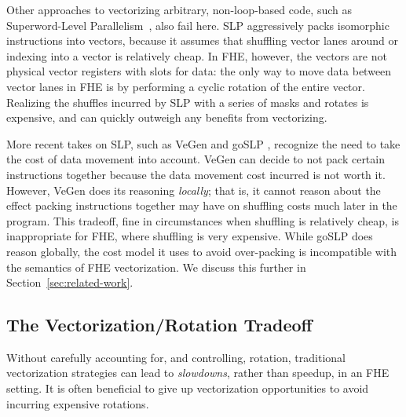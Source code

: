 Other approaches to vectorizing arbitrary, non-loop-based code, such as Superword-Level Parallelism~\cite{SLP}, also fail here.
SLP aggressively packs isomorphic instructions into vectors, because it assumes that shuffling vector lanes around or indexing into a vector is relatively cheap.
In FHE, however, the vectors are not physical vector registers with slots for data: %
the only way to move data between vector lanes in FHE is by performing a cyclic rotation of the entire vector.
Realizing the shuffles incurred by SLP with a series of masks and rotates is expensive, and can quickly outweigh any benefits from vectorizing.

More recent takes on SLP, such as VeGen \cite{VeGen} and goSLP \cite{goSLP}, recognize the need to take the cost of data movement into account.
VeGen 
can decide to not pack certain instructions together because the data movement cost incurred is not worth it.
However, VeGen does its reasoning {\em locally}; that is, it cannot reason about the effect packing instructions together may have on shuffling costs much later in the program. This tradeoff, fine in circumstances when shuffling is relatively cheap, is inappropriate for FHE, where shuffling is very expensive.
While goSLP does reason globally, the cost model it uses to avoid over-packing is incompatible with the semantics of FHE vectorization.
We discuss this further in Section~\ref{sec:related-work}.

\subsection{The Vectorization/Rotation Tradeoff}

Without carefully accounting for, and controlling, rotation, traditional vectorization strategies can lead to {\em slowdowns}, rather than speedup, in an FHE setting. It is often beneficial to give up vectorization opportunities to avoid incurring expensive rotations.

